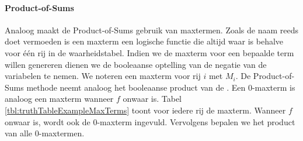 \paragraph{Product-of-Sums} Analoog maakt de Product-of-Sums gebruik van maxtermen. Zoals de naam reeds doet vermoeden is een maxterm een logische functie die altijd waar is behalve voor \'e\'en rij in de waarheidstabel. Indien we de maxterm voor een bepaalde term willen genereren dienen we de booleaanse optelling van de negatie van de variabelen te nemen. We noteren een maxterm voor rij $i$ met $M_i$. De Product-of-Sums methode neemt analoog het booleaanse product van de . Een 0-maxterm is analoog een maxterm wanneer $f$ onwaar is. Tabel \ref{tbl:truthTableExampleMaxTerms} toont voor iedere rij de maxterm. Wanneer $f$ onwaar is, wordt ook de 0-maxterm ingevuld. Vervolgens bepalen we het product van alle 0-maxtermen.
